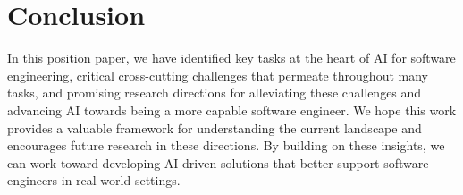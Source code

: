 \vspace{-0.3cm}

\section{Conclusion}

\vspace{-0.2cm}

In this position paper, we have identified key tasks at the heart of AI for software engineering, critical cross-cutting challenges that permeate throughout many tasks, and promising research directions for alleviating these challenges and advancing AI towards being a more capable software engineer.  We hope this work provides a valuable framework for understanding the current landscape and encourages future research in these directions. By building on these insights, we can work toward developing AI-driven solutions that better support software engineers in real-world settings.


